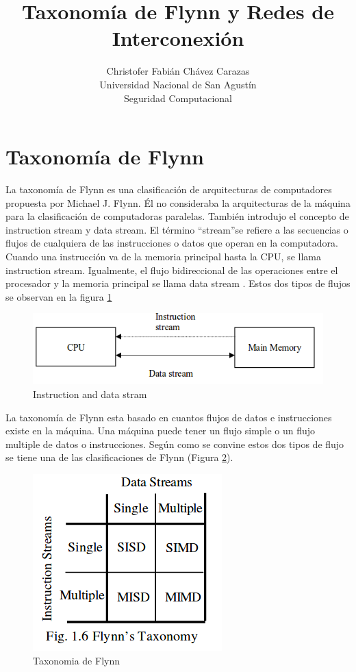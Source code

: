 \documentclass[a4paper,12pt]{article}
\begin{document}
\title{Taxonomía de Flynn y Redes de Interconexión}
\author{
Christofer Fabián Chávez Carazas \\
\small{Universidad Nacional de San Agustín} \\
\small{Seguridad Computacional}
}

\maketitle

\section{Taxonomía de Flynn}

La taxonomía de Flynn es una clasificación de arquitecturas de computadores propuesta por Michael J. Flynn.
Él no consideraba la arquitecturas de la máquina para la clasificación de computadoras paralelas. También
introdujo el concepto de instruction stream y data stream. El término ``stream''se refiere a las secuencias o flujos
de cualquiera de las instrucciones o datos que operan en la computadora. Cuando una instrucción va de la memoria principal
hasta la CPU, se llama instruction stream. Igualmente, el flujo bidireccional de las operaciones entre el procesador
y la memoria principal se llama data stream \cite{libro_2}. Estos dos tipos de flujos se observan en la figura \ref{fig:stream} \par

\begin{figure}
 \centering
 \includegraphics[scale=0.5]{1.png}
 \caption{Instruction and data stram}
 \label{fig:stream}
\end{figure}

La taxonomía de Flynn esta basado en cuantos flujos de datos e instrucciones existe en la máquina. Una máquina puede
tener un flujo simple o un flujo multiple de datos o instrucciones. Según como se convine estos dos tipos de flujo
se tiene una de las clasificaciones de Flynn (Figura \ref{fig:flynn}).

\begin{figure}
 \centering
 \includegraphics[scale=0.5]{2.png}
 \caption{Taxonomia de Flynn}
 \label{fig:flynn}
\end{figure}
\end{document}

